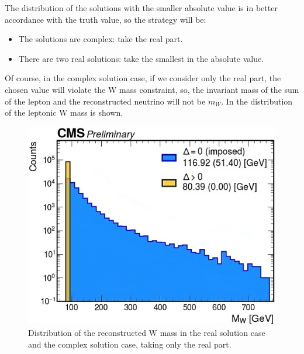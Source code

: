 The distribution of the solutions with the smaller absolute value is in better accordance with the truth value, so the strategy will be:\\
\begin{minipage}{\linewidth}
    \begin{minipage}{0.42\linewidth}

\begin{itemize}
    \item The solutions are complex: take the real part.
    \item There are two real solutions: take the smallest in the absolute value.
\end{itemize}

        Of course, in the complex solution case, if we consider only the real part, the chosen value will violate the W mass constraint, so, the invariant mass of the sum of the lepton and the reconstructed neutrino will not be $m_W$. In   the distribution of the leptonic W mass is shown.
    \end{minipage}
    \hfill
    \begin{minipage}{0.55\linewidth}
    \vspace{-0.2cm}
    \begin{figure}[H]
    \centering
    \includegraphics[width=\linewidth]{fig//chap07-selection/Wmass_reconstructed.png}
    \caption{Distribution of the reconstructed W mass in the real solution case and the complex solution case, taking only the real part.}
    \label{fig:LeptW_reco}
\end{figure}
        
    \end{minipage}

\end{minipage}

\newpage
\
\newpage